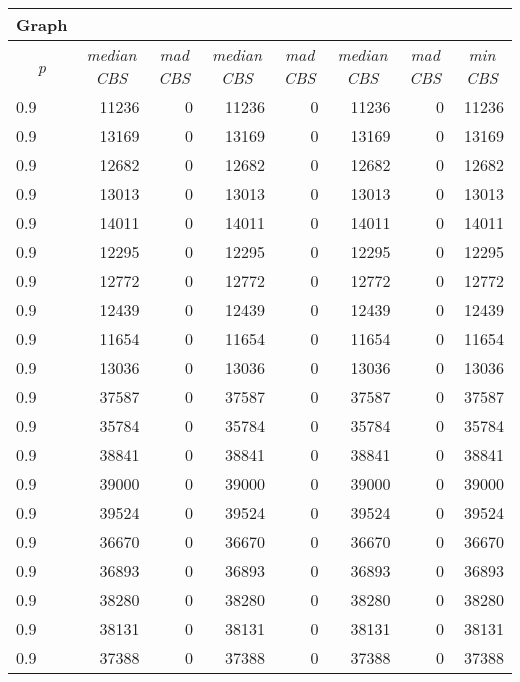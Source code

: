 \documentclass{scrartcl}
\theoremstyle{plain}
\newcommand{\cbs}{CBS}
\begin{document}
\begin{table}[!ht]
	\centering
	\scriptsize
	\begin{tabular}{|l|rr|rr|rr|r|}
	\hline
\multicolumn{1}{|c|}{\textbf{Graph}} & \multicolumn{2}{c|}{} & 
\multicolumn{2}{c|}{} &  \multicolumn{2}{c|}{} & \\ 
\hline	

\multicolumn{1}{|c|}{\emph{p}} &
\multicolumn{1}{c}{\emph{median \cbs{}}} & \multicolumn{1}{c|}{\emph{mad 
\cbs{}}} &
\multicolumn{1}{c}{\emph{median \cbs{}}} & \multicolumn{1}{c|}{\emph{mad 
\cbs{}}} &
\multicolumn{1}{c}{\emph{median \cbs{}}} & \multicolumn{1}{c|}{\emph{mad 
\cbs{}}} &
\multicolumn{1}{|c|}{\emph{min \cbs{}}}

\\ \hline

\makeatletter{}0.9 & 11236 & 0 & 11236 & 0 & 11236 & 0 & 11236 \\ 
0.9 & 13169 & 0 & 13169 & 0 & 13169 & 0 & 13169 \\ 
0.9 & 12682 & 0 & 12682 & 0 & 12682 & 0 & 12682 \\ 
0.9 & 13013 & 0 & 13013 & 0 & 13013 & 0 & 13013 \\ 
0.9 & 14011 & 0 & 14011 & 0 & 14011 & 0 & 14011 \\ 
0.9 & 12295 & 0 & 12295 & 0 & 12295 & 0 & 12295 \\ 
0.9 & 12772 & 0 & 12772 & 0 & 12772 & 0 & 12772 \\ 
0.9 & 12439 & 0 & 12439 & 0 & 12439 & 0 & 12439 \\ 
0.9 & 11654 & 0 & 11654 & 0 & 11654 & 0 & 11654 \\ 
0.9 & 13036 & 0 & 13036 & 0 & 13036 & 0 & 13036 \\ 
0.9 & 37587 & 0 & 37587 & 0 & 37587 & 0 & 37587 \\ 
0.9 & 35784 & 0 & 35784 & 0 & 35784 & 0 & 35784 \\ 
0.9 & 38841 & 0 & 38841 & 0 & 38841 & 0 & 38841 \\ 
0.9 & 39000 & 0 & 39000 & 0 & 39000 & 0 & 39000 \\ 
0.9 & 39524 & 0 & 39524 & 0 & 39524 & 0 & 39524 \\ 
0.9 & 36670 & 0 & 36670 & 0 & 36670 & 0 & 36670 \\ 
0.9 & 36893 & 0 & 36893 & 0 & 36893 & 0 & 36893 \\ 
0.9 & 38280 & 0 & 38280 & 0 & 38280 & 0 & 38280 \\ 
0.9 & 38131 & 0 & 38131 & 0 & 38131 & 0 & 38131 \\ 
0.9 & 37388 & 0 & 37388 & 0 & 37388 & 0 & 37388 \\ 

\end{tabular}
\end{table}
\end{document}
